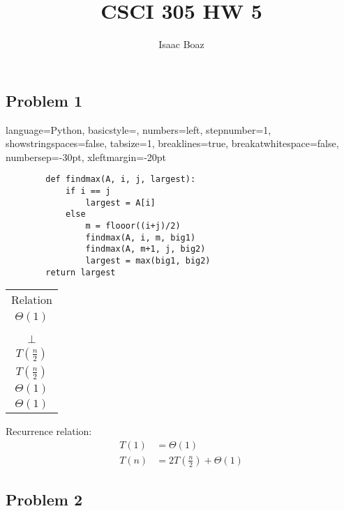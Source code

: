 \documentclass{article}
\title{CSCI 305 HW 5}
\author{Isaac Boaz}
\begin{document}
\maketitle

\subsection*{Problem 1}

\lstset
{ %
    language=Python,
    basicstyle=\footnotesize,
    numbers=left,
    stepnumber=1,
    showstringspaces=false,
    tabsize=1,
    breaklines=true,
    breakatwhitespace=false,
    numbersep=-30pt,
    xleftmargin=-20pt
}

\setlength{\columnseprule}{0.5pt}

\begin{multicols}{2}
    \begin{lstlisting}
        def findmax(A, i, j, largest):
            if i == j
                largest = A[i]
            else
                m = flooor((i+j)/2)
                findmax(A, i, m, big1)
                findmax(A, m+1, j, big2)
                largest = max(big1, big2)
        return largest
    \end{lstlisting}
    \columnbreak
    \footnotesize
    \begin{tabular}{c}
        Relation         \\
        $\Theta(1)$      \\
        \vline           \\
        \vline           \\
        $\bot$           \\
        $T(\frac{n}{2})$ \\
        $T(\frac{n}{2})$ \\
        $\Theta(1)$      \\
        $\Theta(1)$
    \end{tabular}
\end{multicols}

Recurrence relation:
\begin{align*}
    T(1) & = \Theta(1)                   \\
    T(n) & = 2T(\frac{n}{2}) + \Theta(1)
\end{align*}

\subsection*{Problem 2}
\end{document}
